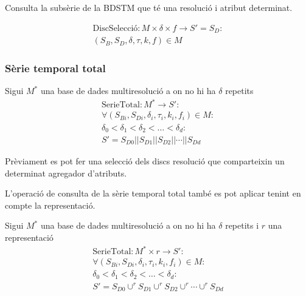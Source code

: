 Consulta la subsèrie de la BDSTM que té una resolució i atribut
determinat. 


\begin{definition}[DiscSelecció]
  \begin{gather*}
    \text{DiscSelecció}: M \times \delta \times f \longrightarrow S' = S_D: \\
    (S_B,S_D,\delta,\tau,k,f) \in M
\end{gather*}
\end{definition}



\subsubsection{Sèrie temporal total}



\begin{definition}
  Sigui $M^*$ una base de dades multiresolució a on no hi ha $\delta$ repetits
  \begin{gather*}
    \text{SerieTotal}: M^* \longrightarrow S': \\
    \forall (S_{Bi},S_{Di},\delta_i,\tau_i,k_i,f_i) \in M : \\
    \delta_0 < \delta_1 < \delta_2 < \dots < \delta_d : \\
    S' = S_{D0} || S_{D1} || S_{D2} || \dotsb || S_{Dd}
\end{gather*}
\end{definition}

Prèviament es pot fer una selecció dels discs resolució que
comparteixin un determinat agregador d'atributs. 



L'operació de consulta de la sèrie temporal total també es pot aplicar
tenint en compte la representació.
\begin{definition}
  Sigui $M^*$ una base de dades multiresolució a on no hi ha $\delta$
  repetits i $r$ una representació
  \begin{gather*}
    \text{SerieTotal}: M^* \times r \longrightarrow S': \\
    \forall (S_{Bi},S_{Di},\delta_i,\tau_i,k_i,f_i) \in M : \\
    \delta_0 < \delta_1 < \delta_2 < \dots < \delta_d : \\
    S' = S_{D0} \cup^r S_{D1} \cup^r  S_{D2}  \cup^r \dotsb \cup^r  S_{Dd}
\end{gather*}
\end{definition}



